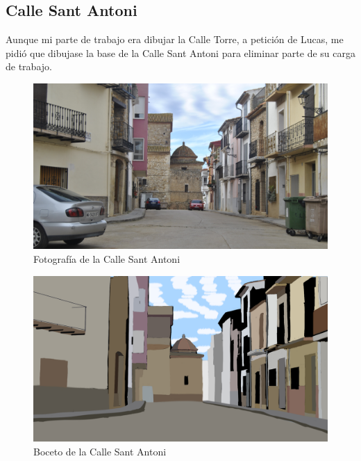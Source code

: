 \documentclass[12pt]{article}
\begin{document}
    \clearpage

    \subsection{Calle Sant Antoni}
        Aunque mi parte de trabajo era dibujar la Calle Torre, a petición de Lucas, me pidió que dibujase la base de la Calle Sant Antoni para eliminar parte de su carga de trabajo.

        \begin{figure}[h!]
            \centering
            \includegraphics[width=\textwidth]{imgs/c_san_antoni_para_lucas_foto.png}
            \caption{Fotografía de la Calle Sant Antoni}
            \label{fig:santantoni_foto_1}
        \end{figure}

        \begin{figure}[h!]
            \centering
            \includegraphics[width=\textwidth]{imgs/c_san_antoni_para_lucas.png}
            \caption{Boceto de la Calle Sant Antoni}
            \label{fig:santantoni_boceto_1}
        \end{figure}
    \newpage
\end{document}
